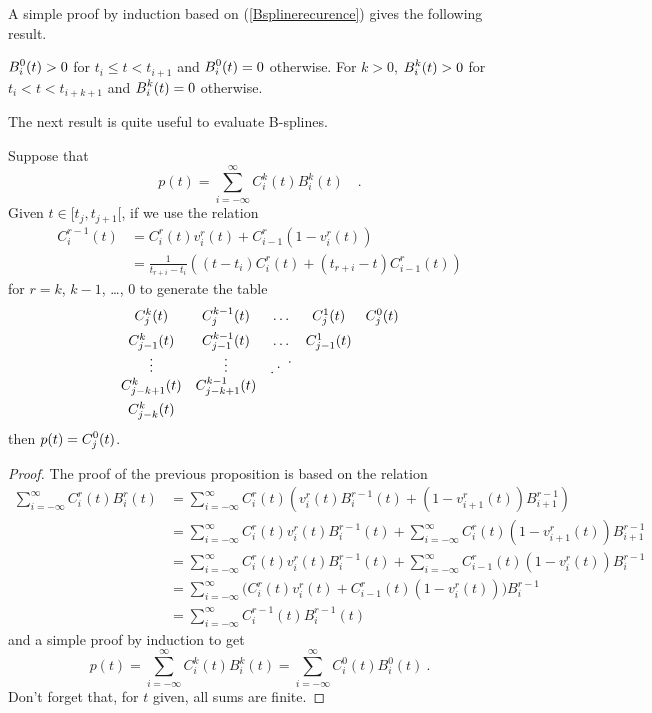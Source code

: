 A simple proof by induction based on (\ref{Bsplinerecurence}) gives
the following result.

\begin{prop}
$\displaystyle B_i^0(t) > 0$ for $t_i \leq t < t_{i+1}$ and
$\displaystyle B_i^0(t) = 0$ otherwise.
For $k>0$, $\displaystyle B_i^k(t) > 0$ for $t_i < t < t_{i+k+1}$
and $\displaystyle B_i^k(t) = 0$ otherwise.
\label{Bsplienonneg}
\end{prop}

The next result is quite useful to evaluate B-splines.

\begin{prop}
Suppose that
\[
  p(t) = \sum_{i=-\infty}^\infty C_i^k(t) B_i^k(t) \quad .
\]
Given $t \in [t_j ,t_{j+1}[$, if we use the relation
\begin{equation}\label{table_spline}
\begin{split}
  C_i^{r-1}(t) &= C_i^r(t) v_i^r(t) + C_{i-1}^r \left( 1-   v_i^r(t)\right) \\
&= \frac{1}{t_{r+i}-t_i} \left( (t-t_i) C_i^r(t) +
  (t_{r+i}-t) C_{i-1}^r(t) \right)
\end{split}
\end{equation}
for $r=k$, $k-1$, \ldots, $0$ to generate the table
\[
\begin{array}{*{4}{c@{\hspace{1em}}}c}
C_j^k(t) & C_j^{k-1}(t) & \ldots & C_j^1(t) & C_j^0(t) \\[0.5em]
C_{j-1}^k(t) & C_{j-1}^{k-1}(t) & \ldots & C_{j-1}^1(t) & \\ 
\vdots & \vdots & \iddots &  & \\
C_{j-k+1}^k(t) & C_{j-k+1}^{k-1}(t) & & & \\[0.5em]
C_{j-k}^k(t) & & & & 
\end{array}
\]
then $\displaystyle p(t) = C_j^0(t)$.
\end{prop}

\begin{proof}
The proof of the previous proposition is based on the relation
\begin{align*}
\sum_{i=-\infty}^\infty C_i^r(t) B_i^r(t)
&= \sum_{i=-\infty}^\infty C_i^r(t) \left( v_i^r(t) B_i^{r-1}(t)
+ \left( 1-v_{i+1}^r(t) \right) B_{i+1}^{r-1}\right) \\
&= \sum_{i=-\infty}^\infty C_i^r(t) v_i^r(t) B_i^{r-1}(t)
+ \sum_{i=-\infty}^\infty C_i^r(t) \left( 1-v_{i+1}^r(t) \right) B_{i+1}^{r-1} \\
&= \sum_{i=-\infty}^\infty C_i^r(t) v_i^r(t) B_i^{r-1}(t)
+ \sum_{i=-\infty}^\infty C_{i-1}^r(t) \left( 1-v_i^r(t) \right) B_i^{r-1} \\
&= \sum_{i=-\infty}^\infty \big( C_i^r(t) v_i^r(t) 
+  C_{i-1}^r(t) \left( 1-v_i^r(t) \right) \big) B_i^{r-1} \\
&= \sum_{i=-\infty}^\infty C_i^{r-1}(t) B_i^{r-1}(t)
\end{align*}
and a simple proof by induction to get
\[
p(t) = \sum_{i=-\infty}^\infty C_i^k(t) B_i^k(t)
= \sum_{i=-\infty}^\infty C_i^0(t) B_i^0(t) \ .
\]
Don't forget that, for $t$ given, all sums are finite.
\end{proof}

